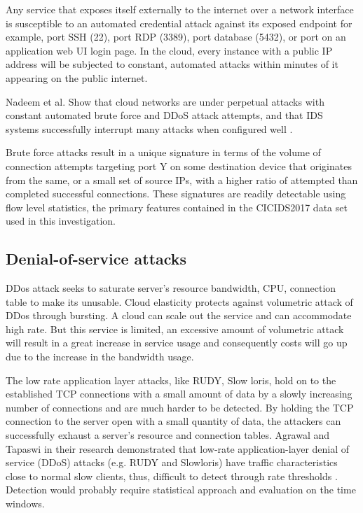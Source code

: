 Any service that exposes itself externally to the internet over a network interface is susceptible to an automated credential attack against its exposed endpoint for example, port SSH (22), port RDP (3389), port database (5432), or port on an application web UI login page. In the cloud, every instance with a public IP address will be subjected to constant, automated attacks within minutes of it appearing on the public internet. 

Nadeem et al. Show that cloud networks are under perpetual attacks with constant automated brute force and DDoS attack attempts, and that IDS systems successfully interrupt many attacks when configured well \cite{nadeem2021intercept}. 

Brute force attacks result in a unique signature in terms of the volume of connection attempts targeting port Y on some destination device that originates from the same, or a small set of source IPs, with a higher ratio of attempted than completed successful connections. These signatures are readily detectable using flow level statistics, the primary features contained in the CICIDS2017 data set used in this investigation.

\subsection{Denial-of-service attacks}

DDos attack seeks to saturate server's resource bandwidth, CPU, connection table to make its unusable. Cloud elasticity protects against volumetric attack of DDos through bursting. A cloud can scale out the service and can accommodate high rate. But this service is limited, an excessive amount of volumetric attack will result in a great increase in service usage and consequently costs will go up due to the increase in the bandwidth usage.

The low rate application layer attacks, like RUDY, Slow loris, hold on to the established TCP connections with a small amount of data by a slowly increasing number of connections and are much harder to be detected. By holding the TCP connection to the server open with a small quantity of data, the attackers can successfully exhaust a server's resource and connection tables. Agrawal and Tapaswi in their research demonstrated that low-rate application-layer denial of service (DDoS) attacks (e.g. RUDY and Slowloris) have traffic characteristics close to normal slow clients, thus, difficult to detect through rate thresholds \cite{agrawal2019ddos}. 
Detection would probably require statistical approach and evaluation on the time windows.

